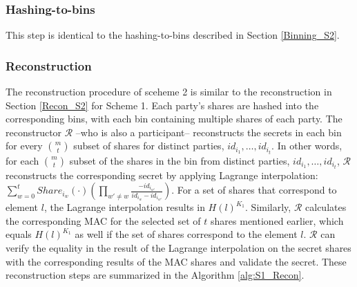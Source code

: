 \subsubsection{Hashing-to-bins}\label{Binning_S1} This step is identical to the hashing-to-bins described in Section \ref{Binning_S2}.

\subsubsection{Reconstruction}\label{Recon_S1}
The reconstruction procedure of sceheme 2 is similar to the reconstruction in Section \ref{Recon_S2} for Scheme 1. Each party's shares are hashed into the corresponding bins, with each bin containing multiple shares of each party. The reconstructor $\mathcal{R}$ --who is also a participant-- reconstructs the secrets in each bin for every $m \choose t$ subset of shares for distinct parties, $id_{i_1}, \dots, id_{i_t}$. In other words, for each $m \choose t$ subset of the shares in the bin from distinct parties, $id_{i_1}, \dots, id_{i_t}$, $\mathcal{R}$ reconstructs the corresponding secret by applying Lagrange interpolation: $\sum^t_{w=0} Share_{i_w}(\cdot)(\prod_{w' \neq w} \frac{-id_{i_{w'}}}{id_{i_w} - id_{i_{w'}}})$. For a set of shares that correspond to element $l$, the Lagrange interpolation results in $H(l)^{K_1}$. Similarly, $\mathcal{R}$ calculates the corresponding MAC for the selected set of $t$ shares mentioned earlier, which equals $H(l)^{K_1}$ as well if the set of shares correspond to the element $l$. $\mathcal{R}$ can verify the equality in the result of the Lagrange interpolation on the secret shares with the corresponding results of the MAC shares and validate the secret. These reconstruction steps are summarized in the Algorithm \ref{alg:S1_Recon}.

